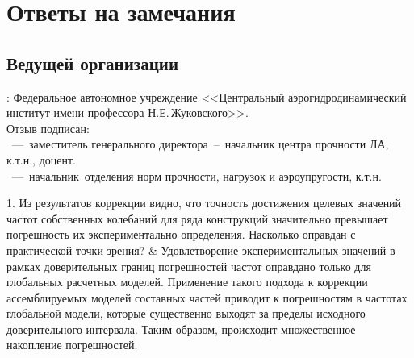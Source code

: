 
\section{Ответы на замечания}

\subsection{Ведущей организации}

\small

\begin{frame}
	\beginSkip
	: Федеральное автономное учреждение <<Центральный аэрогидродинамический институт имени профессора Н.Е.\,Жуковского>>. \\
	Отзыв подписан: \\
	~---~заместитель генерального директора~--~начальник центра прочности ЛА, к.т.н., доцент. \\
	~---~начальник~отделения норм прочности, нагрузок и аэроупругости, к.т.н. \\
	\begin{comtblr}{14em}
		1. Из результатов коррекции видно, что точность достижения целевых значений частот собственных колебаний для ряда конструкций значительно превышает погрешность их экспериментально определения. Насколько оправдан с практической точки зрения?
		& 
		Удовлетворение экспериментальных значений в рамках доверительных границ погрешностей частот оправдано только для глобальных расчетных моделей. Применение такого подхода к коррекции ассемблируемых моделей составных частей приводит к погрешностям в частотах глобальной модели, которые существенно выходят за пределы исходного доверительного интервала. Таким образом, происходит множественное накопление погрешностей.
	\end{comtblr}
\end{frame}


